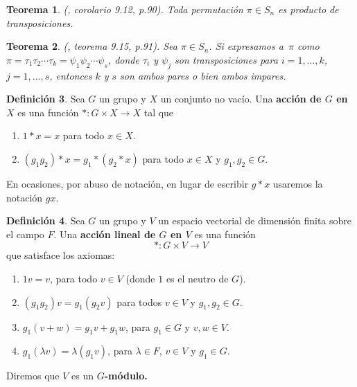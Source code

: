 \documentclass[12pt]{book}
\newtheorem{theorem}{Teorema}[section]
\theoremstyle{definition}
\newtheorem{definition}[theorem]{Definición}
\newcounter{in}
\newcounter{ini}
\begin{document}
\begin{theorem}{\normalfont (\cite{fraleigh}, corolario 9.12, p.90)}.
  \label{per-prod-trans}
  Toda permutación $\pi\in S_{n}$ es producto de transposiciones.
\end{theorem}

\begin{theorem}{\normalfont (\cite{fraleigh}, teorema 9.15, p.91)}.
  \label{trans-par-impar}
  Sea $\pi\in S_{n}$. Si expresamos a~$\pi$ como $\pi=\tau_{1}\tau_{2}\cdots\tau_{k}=\psi_{1}\psi_{2}\cdots\psi_{s}$,
  donde $\tau_{i}$ y $\psi_{j}$ son transposiciones para
  $i=1,\ldots,k$, $j=1,\ldots,s$, entonces $k$ y $s$
  son ambos pares o bien ambos impares.
\end{theorem}

\begin{definition}
  \label{accion-grupo}
  Sea $G$ un grupo y $X$ un conjunto no vacío. Una  \textbf{acción de $G$
  en $X$} es una función $*:G \times X \rightarrow X$ tal que
\begin{enumerate}
\item $1*x=x$ para todo $x\in X.$
\item $(g_{1}g_{2})*x=g_{1}*(g_{2}*x)$ para todo $x\in X$ y $g_{1},g_{2}\in G.$
\end{enumerate}
   En ocasiones, por abuso de notación, en lugar de escribir $g*x$ usaremos la notación $gx$.
\end{definition}

\begin{definition}
  \label{accion-lineal}
  Sea $G$ un grupo y $V$ un
  espacio vectorial de dimensión
  finita sobre el campo $F$. Una
  \textbf{acción lineal de $G$ en
    $V$} es una función
 $$*:G\times V \rightarrow V $$
que satisface los axiomas:
\begin{enumerate}
\item $1v=v$, para todo $v\in V$ (donde $1$ es el neutro de $G$).
\item $(g_{1}g_{2})v=g_{1}(g_{2}v)$ para todos $v\in V$ y
  $g_{1},g_{2}\in G$.
\item $g_{1}(v+w)=g_{1}v+g_{1}w$, para $g_{1}\in G$ y $v,w \in V .$
\item $g_{1}(\lambda v)=\lambda(g_{1}v)$, para $\lambda \in F$,
  $v\in V$ y $g_{1}\in G.$
\end{enumerate}
Diremos que $V$ es un \textbf{$G$-módulo.}
\end{definition} 
\end{document}
